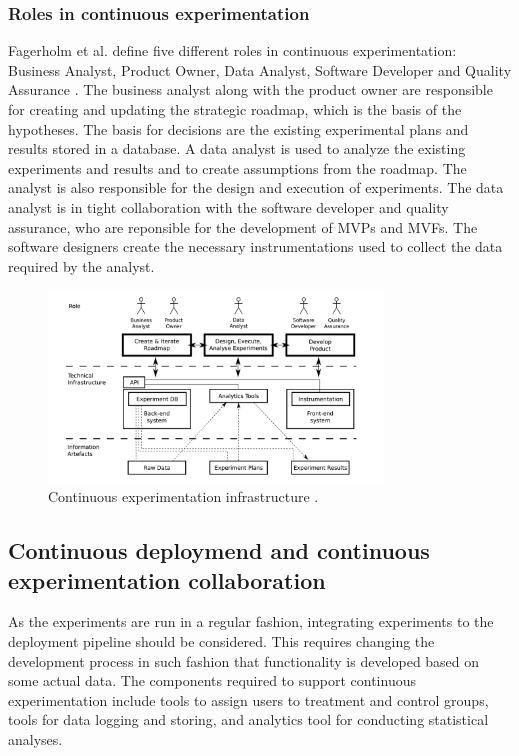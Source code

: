 \documentclass[english]{tktltiki2}
\theoremstyle{definition}
\theoremstyle{remark}
\begin{document}
\subsubsection{Roles in continuous experimentation}
Fagerholm et al. define five different roles in continuous experimentation: Business Analyst, Product Owner, Data Analyst, Software Developer and Quality Assurance \cite{fagerholm2014building}. The business analyst along with the product owner are responsible for creating and updating the strategic roadmap, which is the basis of the hypotheses. The basis for decisions are the existing experimental plans and results stored in a database. A data analyst is used to analyze the existing experiments and results and to create assumptions from the roadmap. The analyst is also responsible for the design and execution of experiments. The data analyst is in tight collaboration with the software developer and quality assurance, who are reponsible for the development of MVPs and MVFs. The software designers create the necessary instrumentations used to collect the data required by the analyst.


\begin{figure}[H]
	\centering
	\includegraphics[width=3.5in]{infra.jpg}
	\caption{Continuous experimentation infrastructure \cite{fagerholm2014building}.}
	\label{fig4}
\end{figure}

\subsection{Continuous deploymend and continuous experimentation collaboration}
As the experiments are run in a regular fashion, integrating experiments to the deployment pipeline should be considered. This requires changing the development process in such fashion that functionality is developed based on some actual data. The components required to support continuous experimentation include tools to assign users to treatment and control groups, tools for data logging and storing, and analytics tool for conducting statistical analyses.
\end{document}
